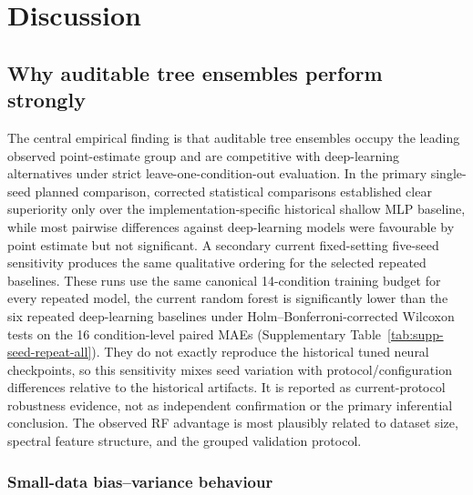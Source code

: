 \section{Discussion}\label{discussion}

\subsection{Why auditable tree ensembles perform
strongly}\label{why-auditable-models-perform-strongly}

The central empirical finding is that auditable tree ensembles occupy the
leading observed point-estimate group and are competitive with deep-learning
alternatives under strict leave-one-condition-out evaluation.  In the
primary single-seed planned comparison, corrected statistical comparisons
established clear superiority only over the implementation-specific historical
shallow MLP baseline, while
most pairwise differences against deep-learning models were favourable by
point estimate but not significant.  A secondary current fixed-setting
five-seed sensitivity produces the same qualitative ordering for the selected
repeated baselines. These runs use the same canonical 14-condition
training budget for every repeated model, the current random forest is
significantly lower than the six repeated deep-learning baselines under
Holm--Bonferroni-corrected Wilcoxon tests on the 16 condition-level paired
MAEs (Supplementary Table~\ref{tab:supp-seed-repeat-all}). They do not exactly
reproduce the historical tuned neural checkpoints, so this sensitivity mixes
seed variation with protocol/configuration differences relative to the
historical artifacts. It is reported as current-protocol robustness evidence,
not as independent confirmation or the primary inferential conclusion. The observed RF advantage is most
plausibly related to dataset size, spectral feature structure, and the
grouped validation protocol.

\subsubsection{Small-data bias--variance
behaviour}\label{small-data-bias-variance}

